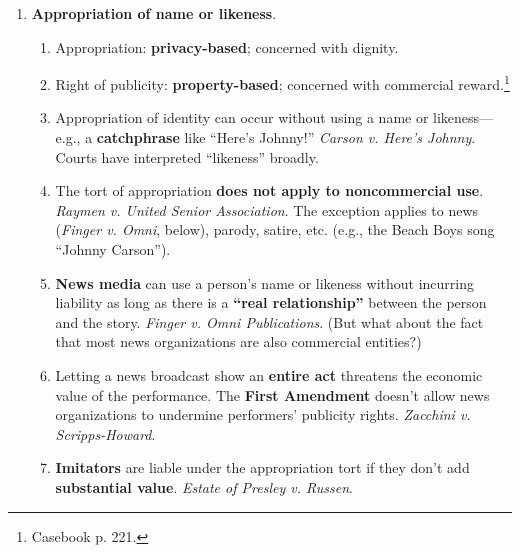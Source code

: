 \begin{enumerate}
\begin{enumerate}
        \begin{enumerate}
            \item Liability arises when ``\textbf{extreme and outrageous 
            conduct intentionally or recklessly} causes severe emotional 
            distress.''\footnote{Casebook p. 211.}
            \item To claim intentional infliction of emotional distress from 
            published material, public figures and officials must also show 
            \emph{New York Times} malice. \emph{Hustler v. Falwell}.
            \item There is \textbf{special protection} for public speech on 
            matters of \textbf{public concern}. \emph{Snyder v. Phelps} 
            (Westboro Baptist).
        \end{enumerate}
    \end{enumerate}
    \item \textbf{Appropriation of name or likeness}.
    \begin{enumerate}
        \item Appropriation: \textbf{privacy-based}; concerned with dignity.
        \item Right of publicity: \textbf{property-based}; concerned with 
        commercial reward.\footnote{Casebook p. 221.}
        \item Appropriation of identity can occur without using a name or 
        likeness---e.g., a \textbf{catchphrase} like ``Here's Johnny!'' 
        \emph{Carson v. Here's Johnny}. Courts have interpreted ``likeness'' 
        broadly.
        \item The tort of appropriation \textbf{does not apply to 
        noncommercial use}. \emph{Raymen v. United Senior Association}. The 
        exception applies to news (\emph{Finger v.  Omni}, below), parody, 
        satire, etc. (e.g., the Beach Boys song ``Johnny Carson'').
        \item \textbf{News media} can use a person's name or likeness without 
        incurring liability as long as there is a \textbf{``real 
        relationship''} between the person and the story. \emph{Finger v. Omni 
        Publications}. (But what about the fact that most news organizations 
        are also commercial entities?)
        \item Letting a news broadcast show an \textbf{entire act} threatens 
        the economic value of the performance. The \textbf{First Amendment} 
        doesn't allow news organizations to undermine performers' publicity 
        rights. \emph{Zacchini v. Scripps-Howard}.
        \item \textbf{Imitators} are liable under the appropriation tort if 
        they don't add \textbf{substantial value}. \emph{Estate of Presley v. 
        Russen}.
    \end{enumerate}
\end{enumerate}
